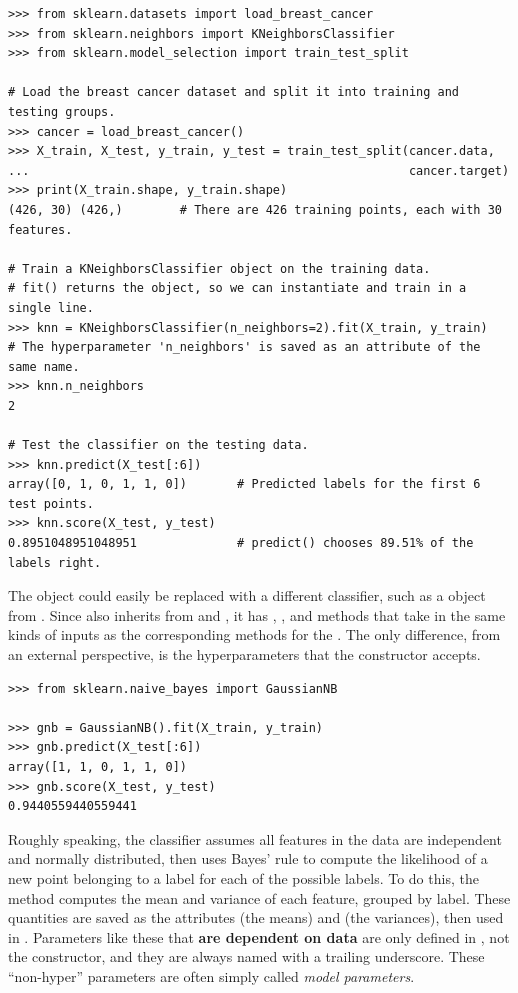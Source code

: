 \begin{lstlisting}
>>> from sklearn.datasets import load_breast_cancer
>>> from sklearn.neighbors import KNeighborsClassifier
>>> from sklearn.model_selection import train_test_split

# Load the breast cancer dataset and split it into training and testing groups.
>>> cancer = load_breast_cancer()
>>> X_train, X_test, y_train, y_test = train_test_split(cancer.data,
...                                                     cancer.target)
>>> print(X_train.shape, y_train.shape)
(426, 30) (426,)        # There are 426 training points, each with 30 features.

# Train a KNeighborsClassifier object on the training data.
# fit() returns the object, so we can instantiate and train in a single line.
>>> knn = KNeighborsClassifier(n_neighbors=2).fit(X_train, y_train)
# The hyperparameter 'n_neighbors' is saved as an attribute of the same name.
>>> knn.n_neighbors
2

# Test the classifier on the testing data.
>>> knn.predict(X_test[:6])
array([0, 1, 0, 1, 1, 0])       # Predicted labels for the first 6 test points.
>>> knn.score(X_test, y_test)
0.8951048951048951              # predict() chooses 89.51% of the labels right.
\end{lstlisting}

The  object could easily be replaced with a different classifier, such as a  object from .
Since  also inherits from  and , it has , , and  methods that take in the same kinds of inputs as the corresponding methods for the .
The only difference, from an external perspective, is the hyperparameters that the constructor accepts.

\begin{lstlisting}
>>> from sklearn.naive_bayes import GaussianNB

>>> gnb = GaussianNB().fit(X_train, y_train)
>>> gnb.predict(X_test[:6])
array([1, 1, 0, 1, 1, 0])
>>> gnb.score(X_test, y_test)
0.9440559440559441
\end{lstlisting}

Roughly speaking, the  classifier assumes all features in the data are independent and normally distributed, then uses Bayes' rule to compute the likelihood of a new point belonging to a label for each of the possible labels.
To do this, the  method computes the mean and variance of each feature, grouped by label.
These quantities are saved as the attributes  (the means) and  (the variances), then used in .
Parameters like these that \textbf{are dependent on data} are only defined in , not the constructor, and they are always named with a trailing underscore.
These ``non-hyper'' parameters are often simply called \emph{model parameters}.

